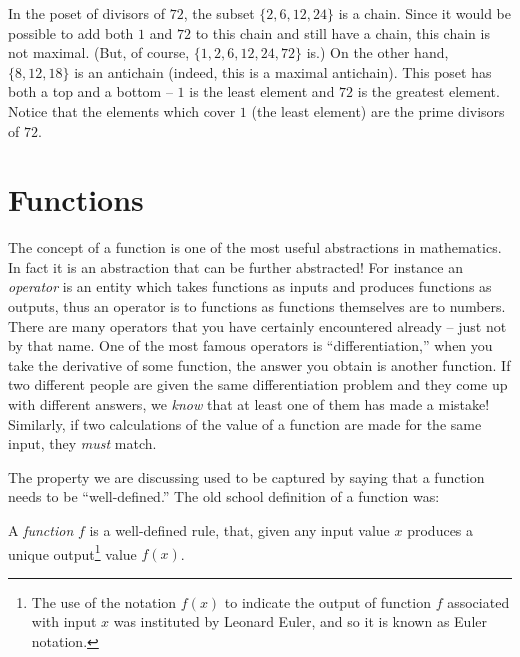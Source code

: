 In the poset of divisors of $72$, the subset $\{2, 6, 12, 24\}$ is a chain.  
Since it would be possible to add both $1$ and $72$ to this chain and still 
have a chain, this chain is not maximal.  (But, of course, 
$\{1, 2, 6, 12, 24, 72\}$ is.)  On the other hand, 
$\{8, 12, 18\}$ is an antichain (indeed, this is a maximal antichain).  
This poset has both a top and a bottom -- $1$ is the least element
and $72$ is the greatest element.   Notice that the elements which cover
$1$ (the least element) are the prime divisors of $72$.

\newpage




\newpage

\section{Functions}
\label{sec:functions}

The concept of a function is one of the most useful abstractions
in mathematics.  In fact it is an abstraction that can be further
abstracted!  For instance an \emph{operator} 
is an entity which takes functions as inputs and produces functions
as outputs, thus an operator is to functions as functions themselves
are to numbers.  There are many operators that you have certainly
encountered already -- just not by that name.  One of the most
famous operators is ``differentiation,'' when you take the derivative
of some function, the answer you obtain is another function.  
If two different people are given the same differentiation problem
and they come up with different answers, we \emph{know} that at least
one of them has made a mistake!  Similarly, if two calculations of the
value of a function are made for the same input, they \emph{must} match.

The property we are discussing used to be captured by saying that a 
function needs to be ``well-defined.''  The old school definition of a 
function was: 

\begin{defi}
 A \emph{function} $f$ is a well-defined rule, that, given any input
value $x$ produces a unique output\footnote{The use of the notation %
$f(x)$ to indicate the output of function $f$ associated with input $x$ %
was instituted by Leonard Euler, and so it is known as Euler notation.} 
value $f(x)$.
\end{defi}


